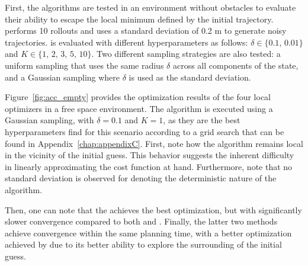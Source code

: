 First, the algorithms are tested in an environment without obstacles to evaluate their ability to escape the local minimum defined by the initial trajectory.
 performs 10 rollouts and uses a standard deviation of 0.2 m to generate noisy trajectories.
 is evaluated with different hyperparameters as follows: $\delta \in \{0.1, \, 0.01\}$ and $K \in \{1, \, 2, \, 3, \, 5, \, 10\}$.
Two different sampling strategies are also tested: a uniform sampling that uses the same radius $\delta$ across all components of the state, and a Gaussian sampling where $\delta$ is used as the standard deviation.

Figure~\ref{fig:acc_empty} provides the optimization results of the four local optimizers in a free space environment.
The  algorithm is executed using a Gaussian sampling, with $\delta = 0.1$ and $K = 1$, as they are the best hyperparameters find for this scenario according to a grid search that can be found in Appendix~\ref{chap:appendixC}.
First, note how the  algorithm remains local in the vicinity of the initial guess.
This behavior suggests the inherent difficulty in linearly approximating the cost function at hand.
Furthermore, note that no standard deviation is observed for  denoting the deterministic nature of the algorithm.

Then, one can note that the  achieves the best optimization, but with significantly slower convergence compared to both  and .
Finally, the latter two methods achieve convergence within the same planning time, with a better optimization achieved by  due to its better ability to explore the surrounding of the initial guess.

